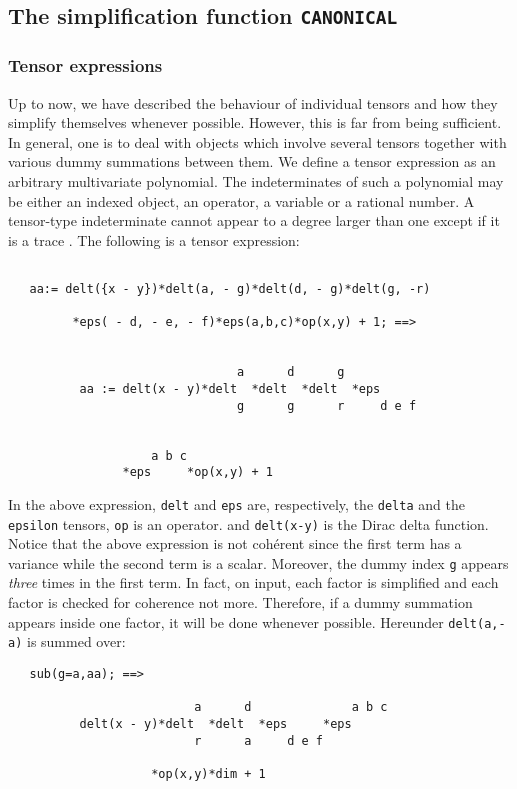 \subsection{The simplification function \texttt{CANONICAL}}

\subsubsection{Tensor expressions}
Up to now, we have described the behaviour of individual
tensors and how they simplify themselves whenever possible.
However, this is far from being sufficient. In general, one is
to deal with objects which involve several tensors together 
with various dummy summations between them.
We define a tensor expression as an arbitrary multivariate 
polynomial. The indeterminates of such a polynomial may be 
either an indexed object, an operator, a variable or a rational number.
A tensor-type indeterminate cannot appear to a degree larger 
than one except if it is a trace%
.
The following is a tensor expression:
\begin{verbatim}

   aa:= delt({x - y})*delt(a, - g)*delt(d, - g)*delt(g, -r)
         
         *eps( - d, - e, - f)*eps(a,b,c)*op(x,y) + 1; ==>


                                a      d      g
          aa := delt(x - y)*delt  *delt  *delt  *eps
                                g      g      r     d e f


                    a b c
                *eps     *op(x,y) + 1

\end{verbatim}
In the above expression, \texttt{delt} and \texttt{eps} are, respectively, the
\texttt{delta} and the \texttt{epsilon} tensors,
\texttt{op} is an operator. 
and \texttt{delt(x-y)} is the Dirac delta function.
Notice that the above expression is not coh\'erent since the first term 
has a variance while the second term is a scalar. Moreover, the 
dummy index \texttt{g} appears \emph{three} times in the first term.
In fact, on input, each factor  is simplified   and each 
factor is checked for coherence not more.
Therefore, if a dummy summation  appears inside one factor, it will 
be done whenever possible. Hereunder \texttt{delt(a,-a)} is 
summed over:
\begin{verbatim}
   sub(g=a,aa); ==>

                          a      d              a b c
          delt(x - y)*delt  *delt  *eps     *eps     
                          r      a     d e f

                    *op(x,y)*dim + 1
\end{verbatim}

